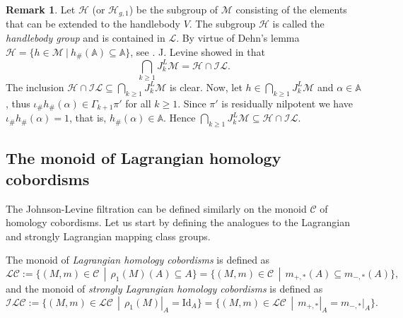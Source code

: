 \documentclass[10pt]{amsart}
\numberwithin{equation}{section}
\numberwithin{equation}{section}
\theoremstyle{definition}
\newtheorem{remark}[theorem]{Remark}
\begin{document}
\begin{remark}\label{handlebodygroup}
Let $\mathcal{H}$ (or $\mathcal{H}_{g,1}$) be the subgroup of $\mathcal{M}$ consisting of the elements that can be extended to the handlebody $V$. The subgroup $\mathcal{H}$ is called the \emph{handlebody group} and is contained in $\mathcal{L}$. By virtue of Dehn's lemma $\mathcal{H}=\{h\in\mathcal{M}\ |\ h_{\#}(\mathbb{A})\subseteq \mathbb{A}\}$, see \cite[Theorem 10.1]{MR0159313}. J. Levine showed in \cite[Proposition 4.1]{MR1823501} that 
$$\bigcap_{k\geq1} J_k^L\mathcal{M}=\mathcal{H}\cap\mathcal{IL}.$$
The inclusion $\mathcal{H}\cap\mathcal{IL}\subseteq \bigcap_{k\geq1} J_k^L\mathcal{M}$ is clear. Now, let $h\in\bigcap_{k\geq1} J_k^L\mathcal{M}$ and $\alpha\in \mathbb{A}$, thus $\iota_{\#}h_{\#}(\alpha)\in\Gamma_{k+1}\pi'$ for all $k\geq1$. Since $\pi'$ is residually nilpotent we have $\iota_{\#}h_{\#}(\alpha)=1$, that is, $h_{\#}(\alpha)\in\mathbb{A}$. Hence $\bigcap_{k\geq1} J_k^L\mathcal{M}\subseteq\mathcal{H}\cap\mathcal{IL}$.
\end{remark}
\subsection{The monoid of Lagrangian homology cobordisms}

The Johnson-Levine filtration can be defined similarly on the monoid $\mathcal{C}$ of homology cobordisms. Let us start by defining the analogues to the Lagrangian and strongly Lagrangian mapping class groups.

The monoid of \emph{Lagrangian homology cobordisms} is defined as
\begin{equation}\label{ecuacion3.20}%
\mathcal{LC}:=\{(M,m)\in\mathcal{C}\ \ |\ \ \rho_1(M)(A)\subseteq A\}=\{(M,m)\in\mathcal{C}\ \ |\ \ m_{+,*}(A)\subseteq m_{-,*}(A)\},
\end{equation}
and the monoid of \emph{strongly Lagrangian homology cobordisms} is defined as
\begin{equation}\label{ecuacion3.21}%
\mathcal{ILC}:=\{(M,m)\in\mathcal{LC}\ \ |\ \ \rho_1(M)|_A=\text{Id}_A\}=\{(M,m)\in\mathcal{LC}\ \ |\ \ m_{+,*}|_A = m_{-,*}|_A\}.
\end{equation}
\end{document}

